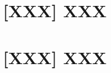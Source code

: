 \documentclass[a4paper,12pt,english]{scrartcl}
\newcommand{\papertitle}[2]{
	\section{[#1] #2}
}
\begin{document}
\pagestyle{fancy} %

\papertitle{XXX}{XXX}
\blindtext\blindtext

\blindtext

\newpage

\papertitle{XXX}{XXX}
\blindtext\blindtext

\blindtext\blindtext
\end{document}
